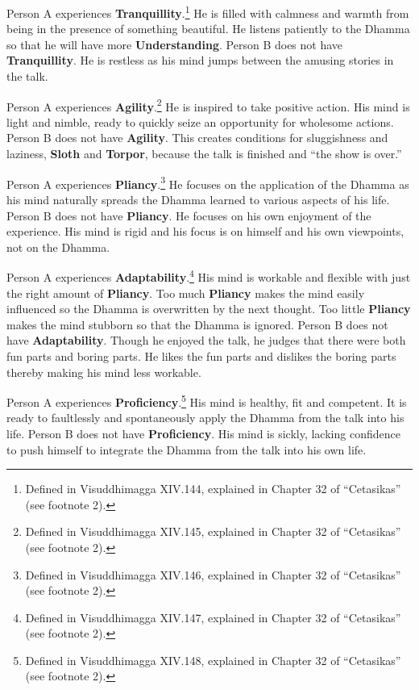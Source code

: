 Person A experiences \textbf{Tranquillity}.\footnote{Defined in Visuddhimagga XIV.144, explained in Chapter 32 of “Cetasikas” (see footnote 2).} He is filled with calmness and warmth from being in the presence of something beautiful. He listens patiently to the Dhamma so that he will have more \textbf{Understanding}. Person B does not have \textbf{Tranquillity}. He is restless as his mind jumps between the amusing stories in the talk.

Person A experiences \textbf{Agility}.\footnote{Defined in Visuddhimagga XIV.145, explained in Chapter 32 of “Cetasikas” (see footnote 2).} He is inspired to take positive action. His mind is light and nimble, ready to quickly seize an opportunity for wholesome actions. Person B does not have \textbf{Agility}. This creates conditions for sluggishness and laziness, \textbf{Sloth} and \textbf{Torpor}, because the talk is finished and “the show is over.”

Person A experiences \textbf{Pliancy}.\footnote{Defined in Visuddhimagga XIV.146, explained in Chapter 32 of “Cetasikas” (see footnote 2).} He focuses on the application of the Dhamma as his mind naturally spreads the Dhamma learned to various aspects of his life. Person B does not have \textbf{Pliancy}. He focuses on his own enjoyment of the experience. His mind is rigid and his focus is on himself and his own viewpoints, not on the Dhamma.

Person A experiences \textbf{Adaptability}.\footnote{Defined in Visuddhimagga XIV.147, explained in Chapter 32 of “Cetasikas” (see footnote 2).} His mind is workable and flexible with just the right amount of \textbf{Pliancy}. Too much \textbf{Pliancy} makes the mind easily influenced so the Dhamma is overwritten by the next thought. Too little \textbf{Pliancy} makes the mind stubborn so that the Dhamma is ignored. Person B does not have \textbf{Adaptability}. Though he enjoyed the talk, he judges that there were both fun parts and boring parts. He likes the fun parts and dislikes the boring parts thereby making his mind less workable.

Person A experiences \textbf{Proficiency}.\footnote{Defined in Visuddhimagga XIV.148, explained in Chapter 32 of “Cetasikas” (see footnote 2).} His mind is healthy, fit and competent. It is ready to faultlessly and spontaneously apply the Dhamma from the talk into his life. Person B does not have \textbf{Proficiency}. His mind is sickly, lacking confidence to push himself to integrate the Dhamma from the talk into his own life.

